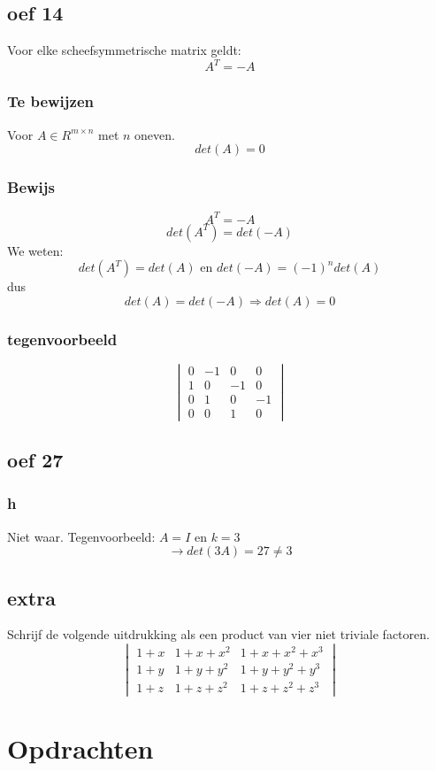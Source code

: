 \documentclass[10pt,a4paper]{article}
\begin{document}
\subsection*{oef 14}
Voor elke scheefsymmetrische matrix geldt:
\[
A^T= -A
\]
\subsubsection*{Te bewijzen}
Voor $A\in R^{m\times n}$ met $n$ oneven.
\[
det(A) = 0
\]
\subsubsection*{Bewijs}
\[
A^T = -A
\]
\[
det(A^T) = det(-A)
\]
We weten:
\[
det(A^T) = det(A) \text{ en } det(-A) = (-1)^n det(A)
\]
dus
\[
det(A) = det(-A) \Rightarrow det(A) = 0
\]

\subsubsection*{tegenvoorbeeld}
\[
\begin{vmatrix}
0 & -1 & 0 & 0\\
1 & 0 & -1 & 0\\
0 & 1 & 0 & -1\\
0 & 0 & 1 & 0
\end{vmatrix}
\]


\subsection*{oef 27}
\subsubsection*{h}
Niet waar. Tegenvoorbeeld: $A=I$ en $k=3$
\[
\rightarrow det(3A) = 27 \neq 3
\]

\subsection*{extra}
Schrijf de volgende uitdrukking als een product van vier niet triviale factoren.
\[
\begin{vmatrix}
1+x & 1+x+x^{2} & 1+x+x^{2}+x^{3}\\
1+y & 1+y+y^{2} & 1+y+y^{2}+y^{3}\\
1+z & 1+z+z^{2} & 1+z+z^{2}+z^{3}
\end{vmatrix}
\]

\section{Opdrachten}
\end{document}
